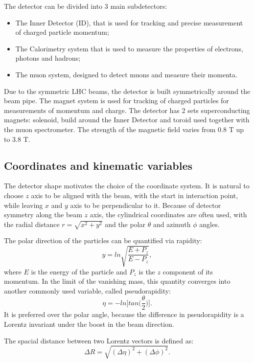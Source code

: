 The \atlas detector can be divided into 3 main subdetectors:
\begin{itemize}
\item The Inner Detector (ID), that is used for tracking and precise measurement of charged particle momentum;
\item The Calorimetry system that is used to measure the properties of electrons, photons and hadrons;
\item The muon system, designed to detect muons and measure their momenta.
\end{itemize}

Due to the symmetric LHC beams, the detector is built symmetrically around the beam pipe. The magnet system is used for tracking of charged particles for measurements of momentum and charge. The \atlas detector has 2 sets superconducting magnets: solenoid, build around the Inner Detector and toroid used together with the muon spectrometer. The strength of the magnetic field varies from 0.8 T up to 3.8 T.

\subsection{Coordinates and kinematic variables}
The detector shape motivates the choice of the coordinate system. It is natural to choose $z$ axis to be aligned with the beam, with the start in interaction point, while leaving $x$ and $y$ axis to be perpendicular to it. Because of detector symmetry along the beam $z$ axis, the cylindrical coordinates are often used, with the radial distance $r=\sqrt{x^2+y^2}$ and the polar $\theta$ and azimuth $\phi$ angles.  

The polar direction of the particles can be quantified via rapidity:
\begin{equation}
y = ln \sqrt{\frac{E+P_z}{E-P_z}},
\end{equation}
where $E$ is the energy of the particle and $P_{z}$ is the $z$ component of its momentum. In the limit of the vanishing mass, this quantity converges into another commonly used variable, called pseudorapidity:
\begin{equation}
\eta = - ln \Big[tan\Big(\frac{\theta}{2}\Big)\Big].
\end{equation}
It is preferred over the polar angle, because the difference in pseudorapidity is a Lorentz invariant under the boost in the beam direction. 

The spacial distance between two Lorentz vectors is defined as:
\begin{equation}
\Delta R = \sqrt{(\Delta\eta)^2+(\Delta\phi)^2}.
\end{equation}


